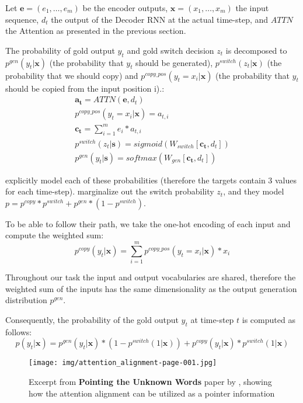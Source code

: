 Let $\boldsymbol{e} = (e_1, \dots, e_m)$ be the encoder outputs, $\boldsymbol{x} = (x_1, \dots, x_m)$ the input sequence, $d_t$ the output of the Decoder RNN at the actual time-step, and $ATTN$ the Attention as presented in the previous section.

The probability of gold output $y_t$ and gold switch decision $z_t$ is decomposed to $p^{gen}(y_t|\boldsymbol{x})$ (the probability that $y_t$ should be generated), $p^{switch}(z_t|\boldsymbol{x})$ (the probability that we should copy) and $p^{copy\_pos}(y_t = x_i |\boldsymbol{x})$ (the probability that $y_t$ should be copied from the input position i).:
\begin{gather}
    \boldsymbol{a_t} = ATTN(\boldsymbol{e}, d_t) \\
    p^{copy\_pos}(y_t = x_i | \boldsymbol{x}) = a_{t, i} \\
    \boldsymbol{c_t} = \sum_{i=1}^m{e_i * a_{t, i}} \\
    p^{switch}(z_t | \boldsymbol{s}) = sigmoid(W_{switch}[\boldsymbol{c_t}, d_t]) \\
    p^{gen}(y_t | \boldsymbol{s}) = softmax(W_{gen}[\boldsymbol{c_t}, d_t])
\end{gather}

\citet{gulcehre2016pointing} explicitly model each of these probabilities (therefore the targets contain 3 values for each time-step). \citet{yang2016referenceaware} marginalize out the switch probability $z_t$, and they model $p = p^{copy} * p^{switch} + p^{gen} * (1 - p^{switch})$.

To be able to follow their path, we take the one-hot encoding of each input and compute the weighted sum:
\begin{equation}
    p^{copy}(y_t|\boldsymbol{x}) = \sum_{i=1}^m{p^{copy\_pos}(y_t = x_i | \boldsymbol{x}) * x_i}
\end{equation}

Throughout our task the input and output vocabularies are shared, therefore the weighted sum of the inputs has the same dimensionality as the output generation distribution $p^{gen}$.

Consequently, the probability of the gold output $y_t$ at time-step $t$ is computed as follows:
\begin{equation}
    p(y_t|\boldsymbol{x}) = p^{gen}(y_t|\boldsymbol{x})*(1-p^{switch}(1|\boldsymbol{x})) + p^{copy}(y_t|\boldsymbol{x})*p^{switch}(1|\boldsymbol{x})
\end{equation}

\begin{figure}[hb]
    \centering
    \texttt{[image: img/attention\_alignment-page-001.jpg]}
    \caption{Excerpt from \textbf{Pointing the Unknown Words} paper by \citet{gulcehre2016pointing}, showing how the attention alignment can be utilized as a pointer information}
\end{figure}